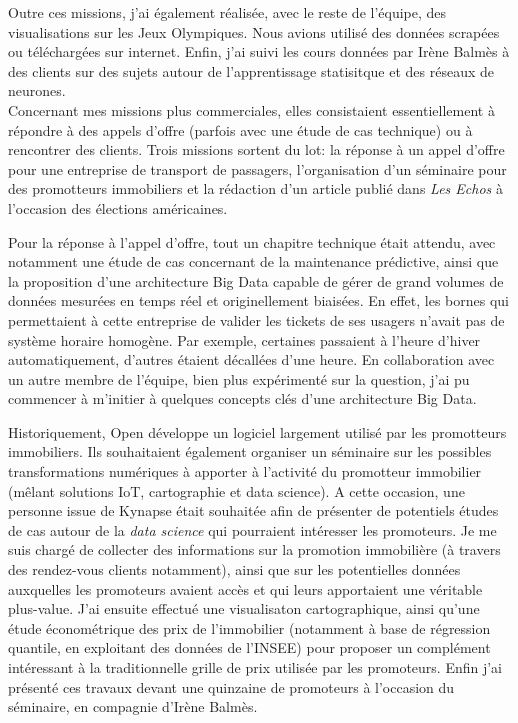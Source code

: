 \documentclass[a4paper]{article}
\begin{document}
	Outre ces missions, j'ai également réalisée, avec le reste de l'équipe, des visualisations sur les Jeux Olympiques. Nous avions utilisé des données scrapées ou téléchargées sur internet. Enfin, j'ai suivi les cours données par Irène Balmès à des clients sur des sujets autour de l'apprentissage statisitque et des réseaux de neurones.\\
	
	Concernant mes missions plus commerciales, elles consistaient essentiellement à répondre à des appels d'offre (parfois avec une étude de cas technique) ou à rencontrer des clients. Trois missions sortent du lot: la réponse à un appel d'offre pour une entreprise de transport de passagers, l'organisation d'un séminaire pour des promotteurs immobiliers et la rédaction d'un article publié dans \textit{Les Echos} à l'occasion des élections américaines.
	
	Pour la réponse à l'appel d'offre, tout un chapitre technique était attendu, avec notamment une étude de cas concernant de la maintenance prédictive, ainsi que la proposition d'une architecture Big Data capable de gérer de grand volumes de données mesurées en temps réel et originellement biaisées. En effet, les bornes qui permettaient à cette entreprise de valider les tickets de ses usagers n'avait pas de système horaire homogène. Par exemple, certaines passaient à l'heure d'hiver automatiquement, d'autres étaient décallées d'une heure. En collaboration avec un autre membre de l'équipe, bien plus expérimenté sur la question, j'ai pu commencer à m'initier à quelques concepts clés d'une architecture Big Data.
	
	Historiquement, Open développe un logiciel largement utilisé par les promotteurs immobiliers. Ils souhaitaient également organiser un séminaire sur les possibles transformations numériques à apporter à l'activité du promotteur immobilier (mêlant solutions IoT, cartographie et data science). A cette occasion, une personne issue de Kynapse était souhaitée afin de présenter de potentiels études de cas autour de la \emph{data science} qui pourraient intéresser les promoteurs. Je me suis chargé de collecter des informations sur la promotion immobilière (à travers des rendez-vous clients notamment), ainsi que sur les potentielles données auxquelles les promoteurs avaient accès et qui leurs apportaient une véritable plus-value. J'ai ensuite effectué une visualisaton cartographique, ainsi qu'une étude économétrique des prix de l'immobilier (notamment à base de régression quantile, en exploitant des données de l'INSEE) pour proposer un complément intéressant à la traditionnelle grille de prix utilisée par les promoteurs. Enfin j'ai présenté ces travaux devant une quinzaine de promoteurs à l'occasion du séminaire, en compagnie d'Irène Balmès.
	
\end{document}
